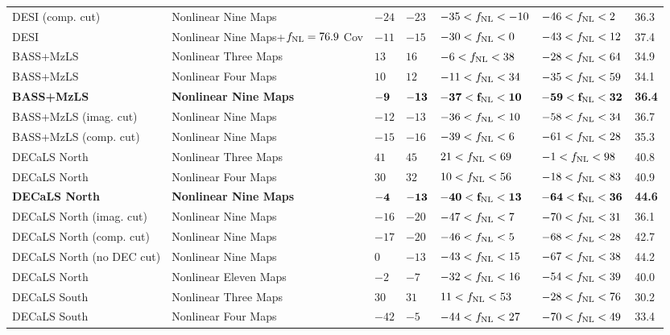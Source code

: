\begin{table}
\begin{tabular}{lllllll}
DESI (comp. cut) & Nonlinear Nine Maps  & $   -24$& $   -23$& $   -35<f_{\rm NL}<   -10$& $   -46<f_{\rm NL}<     2$ &   36.3\\
DESI & Nonlinear Nine Maps+$f_{\rm NL}=76.9$ Cov& $   -11$& $   -15$& $   -30<f_{\rm NL}<    0$& $   -43<f_{\rm NL}<    12$ &   37.4\\
   \hline
BASS+MzLS & Nonlinear Three Maps        & $    13$& $    16$& $    -6<f_{\rm NL}<    38$& $   -28<f_{\rm NL}<    64$ &   34.9\\
BASS+MzLS & Nonlinear Four Maps         & $    10$& $    12$& $   -11<f_{\rm NL}<    34$& $   -35<f_{\rm NL}<    59$ &   34.1\\
\bf{BASS+MzLS} & \bf{Nonlinear Nine Maps}         & $    \bf{-9}$& $   \bf{-13}$& $   \bf{-37}<f_{\rm NL}<    \bf{10}$& $   \bf{-59}<f_{\rm NL}<    \bf{32}$ &   \bf{36.4}\\
BASS+MzLS (imag. cut) & Nonlinear Nine Maps& $   -12$& $   -13$& $   -36<f_{\rm NL}<    10$& $   -58<f_{\rm NL}<    34$ &   36.7\\
BASS+MzLS (comp. cut) & Nonlinear Nine Maps& $   -15$& $   -16$& $   -39<f_{\rm NL}<     6$& $   -61<f_{\rm NL}<    28$ &   35.3\\
   \hline
DECaLS North & Nonlinear Three Maps     & $    41$& $    45$& $    21<f_{\rm NL}<    69$& $    -1<f_{\rm NL}<    98$ &   40.8\\
DECaLS North & Nonlinear Four Maps      & $    30$& $    32$& $    10<f_{\rm NL}<    56$& $   -18<f_{\rm NL}<    83$ &   40.9\\
\bf{DECaLS North} & \bf{Nonlinear Nine Maps}      & $    \bf{-4}$& $ \bf{-13}$& $  \bf{-40}<f_{\rm NL}<   \bf{13}$& $   \bf{-64}<f_{\rm NL}<   \bf{36}$ &  \bf{44.6}\\
DECaLS North (imag. cut) & Nonlinear Nine Maps& $   -16$& $   -20$& $   -47<f_{\rm NL}<     7$& $   -70<f_{\rm NL}<    31$ &   36.1\\
DECaLS North (comp. cut) & Nonlinear Nine Maps& $   -17$& $   -20$& $   -46<f_{\rm NL}<     5$& $   -68<f_{\rm NL}<    28$ &   42.7\\
DECaLS North (no DEC cut) & Nonlinear Nine Maps& $     0$& $   -13$& $   -43<f_{\rm NL}<    15$& $   -67<f_{\rm NL}<    38$ &   44.2\\
DECaLS North & Nonlinear Eleven Maps        & $    -2$& $    -7$& $   -32<f_{\rm NL}<    16$& $   -54<f_{\rm NL}<    39$ &   40.0\\
   \hline
DECaLS South & Nonlinear Three Maps     & $    30$& $    31$& $    11<f_{\rm NL}<    53$& $   -28<f_{\rm NL}<    76$ &   30.2\\
DECaLS South & Nonlinear Four Maps      & $   -42$& $    -5$& $   -44<f_{\rm NL}<    27$& $   -70<f_{\rm NL}<    49$ &   33.4\\

\end{tabular}
\end{table}
